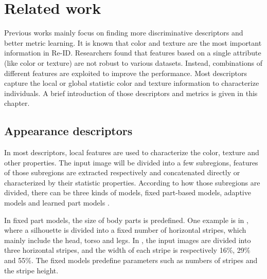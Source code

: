\chapter{Related work}
Previous works mainly focus on finding more discriminative descriptors and better metric learning. It is known that color and texture are the most important information in Re-ID. Researchers found that features based on a single attribute (like color or texture) are not robust to various datasets. Instead, combinations of different features are exploited to improve the performance. Most descriptors capture the local or global statistic color and texture information to characterize individuals. A brief introduction of those descriptors and metrics is given in this chapter.

\section{Appearance descriptors}
In most descriptors, local features \cite{Appearancedesc} are used to characterize the color, texture and other properties. The input image will be divided into a few subregions, features of those subregions are extracted respectively and concatenated directly or characterized by their statistic properties. According to how those subregions are divided, there can be three kinds of models, fixed part-based models, adaptive models and learned part models \cite{Appearancedesc}. 

In fixed part models, the size of body parts is predefined. One example is in \cite{ImportantFeatures, PRDC, REIDSVM}, where a silhouette is divided into a fixed number of horizontal stripes, which mainly include the head, torso and legs. In \cite{AppBasedREID}, the input images are divided into three horizontal stripes, and the width of each stripe is respectively 16\%, 29\% and 55\%.  The fixed models predefine parameters such as numbers of stripes and the stripe height. 

